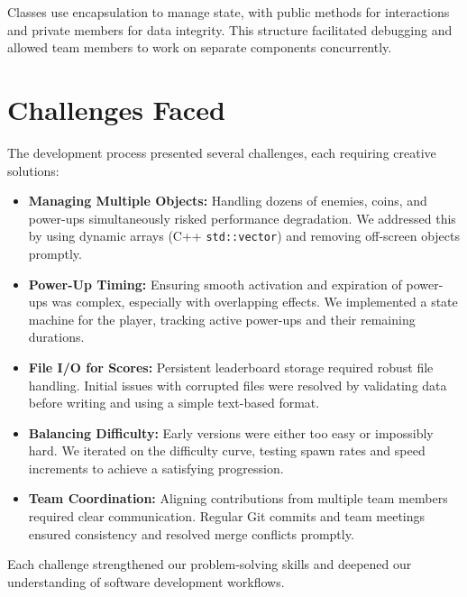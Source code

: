 \documentclass[12pt,a4paper]{article}
\begin{document}
Classes use encapsulation to manage state, with public methods for interactions and private members for data integrity. This structure facilitated debugging and allowed team members to work on separate components concurrently. \\

\section{Challenges Faced}

The development process presented several challenges, each requiring creative solutions: \\

\begin{itemize}
    \item \textbf{Managing Multiple Objects:} Handling dozens of enemies, coins, and power-ups simultaneously risked performance degradation. We addressed this by using dynamic arrays (C++ \texttt{std::vector}) and removing off-screen objects promptly. \\
    \item \textbf{Power-Up Timing:} Ensuring smooth activation and expiration of power-ups was complex, especially with overlapping effects. We implemented a state machine for the player, tracking active power-ups and their remaining durations. \\
    \item \textbf{File I/O for Scores:} Persistent leaderboard storage required robust file handling. Initial issues with corrupted files were resolved by validating data before writing and using a simple text-based format. \\
    \item \textbf{Balancing Difficulty:} Early versions were either too easy or impossibly hard. We iterated on the difficulty curve, testing spawn rates and speed increments to achieve a satisfying progression. \\
    \item \textbf{Team Coordination:} Aligning contributions from multiple team members required clear communication. Regular Git commits and team meetings ensured consistency and resolved merge conflicts promptly. \\
\end{itemize}

Each challenge strengthened our problem-solving skills and deepened our understanding of software development workflows. \\
\end{document}
